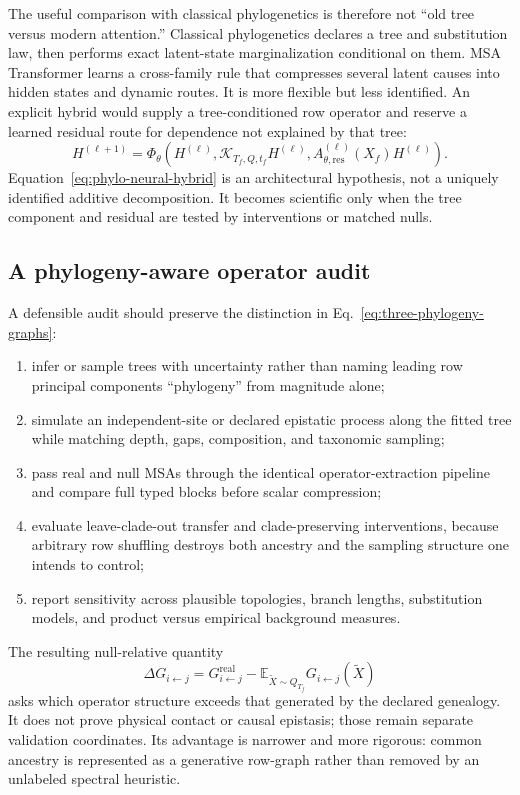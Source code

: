 \documentclass[10pt]{article}
\newcommand{\E}{\mathbb E}
\theoremstyle{definition}
\theoremstyle{remark}
\newcommand{\BookSection}[1]{\subsection{#1}}
\begin{document}
The useful comparison with classical phylogenetics is therefore not ``old tree versus modern
attention.''  Classical phylogenetics declares a tree and substitution law, then performs exact
latent-state marginalization conditional on them.  MSA Transformer learns a cross-family rule that
compresses several latent causes into hidden states and dynamic routes.  It is more flexible but
less identified.  An explicit hybrid would supply a tree-conditioned row operator and reserve a
learned residual route for dependence not explained by that tree:
\begin{equation}
H^{(\ell+1)}
=\Phi_\theta\!\left(
H^{(\ell)},
\mathcal K_{T_f,Q,t_f}H^{(\ell)},
A_{\theta,\mathrm{res}}^{(\ell)}(X_f)H^{(\ell)}
\right).
\label{eq:phylo-neural-hybrid}
\end{equation}
Equation~\ref{eq:phylo-neural-hybrid} is an architectural hypothesis, not a uniquely identified
additive decomposition.  It becomes scientific only when the tree component and residual are
tested by interventions or matched nulls.

\BookSection{A phylogeny-aware operator audit}

A defensible audit should preserve the distinction in Eq.~\ref{eq:three-phylogeny-graphs}:
\begin{enumerate}
\setlength{\itemsep}{2pt}
\item infer or sample trees with uncertainty rather than naming leading row principal components
``phylogeny'' from magnitude alone;
\item simulate an independent-site or declared epistatic process along the fitted tree while
matching depth, gaps, composition, and taxonomic sampling;
\item pass real and null MSAs through the identical operator-extraction pipeline and compare full
typed blocks before scalar compression;
\item evaluate leave-clade-out transfer and clade-preserving interventions, because arbitrary row
shuffling destroys both ancestry and the sampling structure one intends to control;
\item report sensitivity across plausible topologies, branch lengths, substitution models, and
product versus empirical background measures.
\end{enumerate}
The resulting null-relative quantity
\begin{equation}
\Delta G_{i\leftarrow j}
=G_{i\leftarrow j}^{\mathrm{real}}
-\E_{\widetilde X\sim Q_{T_f}}
G_{i\leftarrow j}(\widetilde X)
\label{eq:phylo-null-operator}
\end{equation}
asks which operator structure exceeds that generated by the declared genealogy.  It does not prove
physical contact or causal epistasis; those remain separate validation coordinates.  Its advantage
is narrower and more rigorous: common ancestry is represented as a generative row-graph rather
than removed by an unlabeled spectral heuristic.
\end{document}
